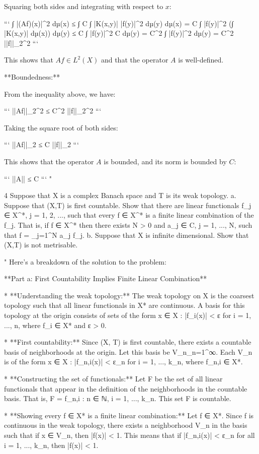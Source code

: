 Squaring both sides and integrating with respect to $x$:

```
∫ |(Af)(x)|^2 dµ(x) ≤ ∫ C ∫ |K(x,y)| |f(y)|^2 dµ(y) dµ(x)
                   = C ∫ |f(y)|^2 (∫ |K(x,y)| dµ(x)) dµ(y)
                   ≤ C ∫ |f(y)|^2 C dµ(y)
                   = C^2 ∫ |f(y)|^2 dµ(y)
                   = C^2 ||f||_2^2
```

This shows that $Af \in L^2(X)$ and that the operator $A$ is well-defined.

**Boundedness:**

From the inequality above, we have:

```
||Af||_2^2 ≤ C^2 ||f||_2^2
```

Taking the square root of both sides:

```
||Af||_2 ≤ C ||f||_2
```

This shows that the operator $A$ is bounded, and its norm is bounded by $C$:

```
||A|| ≤ C
```
"

4 Suppose that X is a complex Banach space and T is its weak topology.
a. Suppose that (X,T) is first countable. Show that there are linear functionals f_j ∈ X^*, j = 1, 2, ..., such that every f ∈ X^* is a finite linear combination of the f_j. That is, if f ∈ X^* then there exists N > 0 and a_j ∈ C, j = 1, ..., N, such that f = \sum_{j=1}^N a_j f_j.
b. Suppose that X is infinite dimensional. Show that (X,T) is not metrisable.

"
Here's a breakdown of the solution to the problem:

**Part a: First Countability Implies Finite Linear Combination**

* **Understanding the weak topology:** The weak topology on X is the coarsest topology such that all linear functionals in X* are continuous. A basis for this topology at the origin consists of sets of the form {x ∈ X : |f_i(x)| < ε for i = 1, ..., n}, where f_i ∈ X* and ε > 0.

* **First countability:** Since (X, T) is first countable, there exists a countable basis of neighborhoods at the origin. Let this basis be {V_n}_n=1^∞. Each V_n is of the form {x ∈ X : |f_{n,i}(x)| < ε_n for i = 1, ..., k_n}, where f_{n,i} ∈ X*.

* **Constructing the set of functionals:** Let F be the set of all linear functionals that appear in the definition of the neighborhoods in the countable basis. That is, F = {f_{n,i} : n ∈ ℕ, i = 1, ..., k_n}. This set F is countable.

* **Showing every f ∈ X* is a finite linear combination:** Let f ∈ X*. Since f is continuous in the weak topology, there exists a neighborhood V_n in the basis such that if x ∈ V_n, then |f(x)| < 1. This means that if |f_{n,i}(x)| < ε_n for all i = 1, ..., k_n, then |f(x)| < 1.

